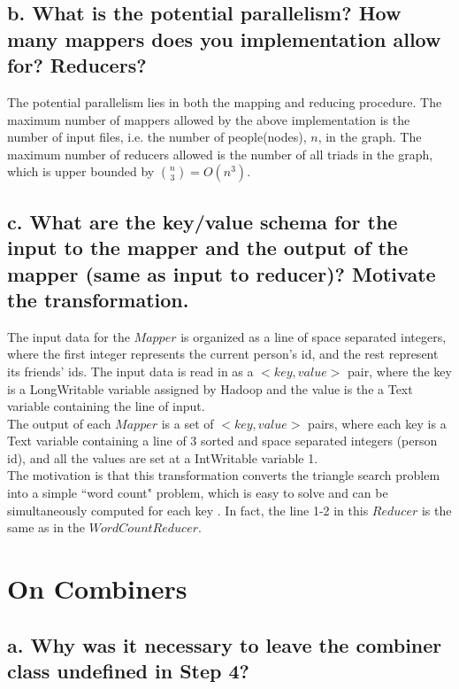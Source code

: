 \documentclass[11 pt, a4paper]{article}  %
\begin{document}
\subsection*{b. What is the potential parallelism? How many mappers does you implementation allow for? Reducers?}

The potential parallelism lies in both the mapping and reducing procedure. The maximum number of mappers allowed by the above implementation is the number of input files, i.e. the number of people(nodes), $n$, in the graph. The maximum number of reducers allowed is the number of all triads in the graph, which is upper bounded by ${n \choose 3} = O(n^3)$. 

\subsection*{c. What are the key/value schema for the input to the mapper and the output of the mapper (same as input to reducer)? Motivate the transformation.}

The input data for the $Mapper$ is organized as a line of space separated integers, where the first integer represents the current person's id, and the rest represent its friends' ids. The input data is read in as a $<key,value>$ pair, where the key is a LongWritable variable assigned by Hadoop and the value is the a Text variable containing the line of input. \\

The output of each $Mapper$ is a set of $<key,value>$ pairs, where each key is a Text variable containing a line of 3 sorted and space separated integers (person id), and all the values are set at a IntWritable variable 1.\\ 

The motivation is that this transformation converts the triangle search problem into a simple ``word count" problem, which is easy to solve and can be simultaneously computed for each key . In fact, the line 1-2 in this $Reducer$ is the same as in the $WordCount Reducer$.


\section{On Combiners}
\subsection*{a. Why was it necessary to leave the combiner class undefined in Step 4?} 
\end{document}

